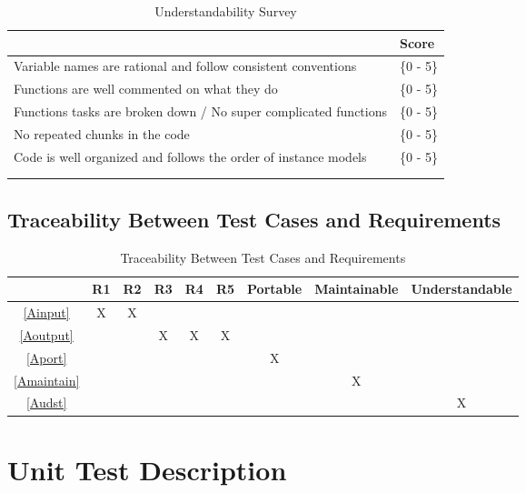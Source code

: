 \documentclass[12pt, titlepage]{article}
\begin{document}
\begin{longtable}[h]{l l}
\label{ut}
	\begin{tabular}{l l} 
	\toprule		
	\textbf{Item} & \textbf{Score}\\
	\midrule 
	Variable names are rational and follow consistent conventions & \{0 - 5\}\\
	Functions are well commented on what they do & \{0 - 5\} \\
	Functions tasks are broken down / No super complicated functions & \{0 - 5\} \\
	No repeated chunks in the code & \{0 - 5\} \\
	Code is well organized and follows the order of instance models & \{0 - 5\} \\
	\bottomrule
	\caption{Understandability Survey} \label{Undgradesheet} \\
\end{tabular}\\
\end{longtable}

\subsection{Traceability Between Test Cases and Requirements}

\begin{table}[h!]
	\centering
	\begin{tabular}{|c|c|c|c|c|c|c|c|c|}
		\hline
		& R1 & R2 & R3 & R4 & R5 & Portable & Maintainable & Understandable\\
		\hline
		\ref{Ainput}    &X&X& & & & & & \\ \hline
		\ref{Aoutput}   & & &X&X&X& & & \\ \hline
		\ref{Aport}     & & & & & &X& & \\ \hline
		\ref{Amaintain} & & & & & & &X& \\ \hline
		\ref{Audst}     & & & & & & & &X\\ \hline
	\end{tabular}
	\caption{Traceability Between Test Cases and Requirements}
	\label{Table:A_trace}
\end{table}

\section{Unit Test Description}
\label{unittest}

\end{document}
